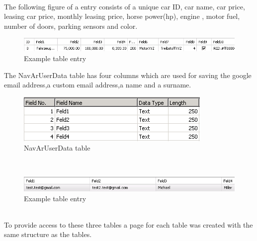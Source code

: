 \\
The following figure of a entry consists of a unique car ID, car name, car price, leasing car price, monthly leasing price, horse power(hp), engine , motor fuel, number of doors, parking sensors and color. 
\newline  
\begin{figure}[htbp]
\centering
\includegraphics[width=\textwidth,height=\textheight,keepaspectratio]{graphics/cardatatablentry.png}
\caption{Example table entry}
\end{figure}
\newpage
The NavArUserData table has four columns which are used for saving the google email address,a custom email address,a name and a surname.
\\
\begin{figure}[htbp]
\centering
\includegraphics[width=\textwidth,height=\textheight,keepaspectratio]{graphics/userdatatable.png}
\caption{NavArUserData table }
\end{figure}
\\
\begin{figure}[htbp]
\centering
\includegraphics[width=\textwidth,height=\textheight,keepaspectratio]{graphics/userdatatableentry.png}
\caption{Example table entry}
\end{figure}
\\
To provide access to these three tables a page for each table was created with the same structure as the tables.  
\newpage
